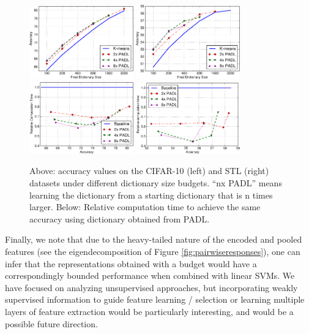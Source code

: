\begin{figure}
    \centering
    \includegraphics[width=0.4\textwidth]{figs/sizematters/cifar_accuracy.pdf}
    \includegraphics[width=0.4\textwidth]{figs/sizematters/stl_accuracy.pdf}\\
    \includegraphics[width=0.4\textwidth]{figs/sizematters/cifar_speedup.pdf}
    \includegraphics[width=0.4\textwidth]{figs/sizematters/stl_speedup.pdf}
    \caption{Above: accuracy values on the CIFAR-10 (left) and STL (right) datasets under different dictionary size budgets. ``nx PADL'' means learning the dictionary from a starting dictionary that is n times larger. Below: Relative computation time to achieve the same accuracy using dictionary obtained from PADL.}\label{fig:cifarstl}
\end{figure}

Finally, we note that due to the heavy-tailed nature of the encoded and pooled features (see the eigendecomposition of Figure \ref{fig:pairwiseresponses}), one can infer that the representations obtained with a budget would have a correspondingly bounded performance when combined with linear SVMs. We have focused on analyzing unsupervised approaches, but incorporating weakly supervised information to guide feature learning / selection or learning multiple layers of feature extraction would be particularly interesting, and would be a possible future direction.
